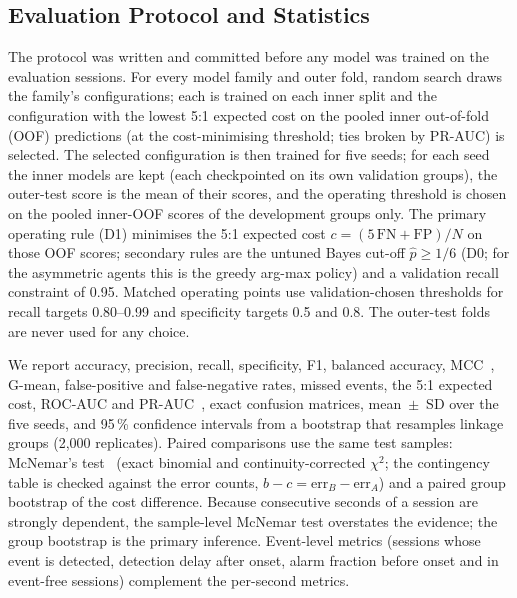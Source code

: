 \subsection{Evaluation Protocol and Statistics}
\label{sec:protocol}
The protocol was written and committed before any model was trained on the evaluation sessions. For every model family and outer fold, random search draws the family's configurations; each is trained on each inner split and the configuration with the lowest 5:1 expected cost on the pooled inner out-of-fold (OOF) predictions (at the cost-minimising threshold; ties broken by PR-AUC) is selected. The selected configuration is then trained for five seeds; for each seed the \nInner{} inner models are kept (each checkpointed on its own validation groups), the outer-test score is the mean of their scores, and the operating threshold is chosen on the pooled inner-OOF scores of the development groups only. The primary operating rule (D1) minimises the 5:1 expected cost $c=(5\,\mathrm{FN}+\mathrm{FP})/N$ on those OOF scores; secondary rules are the untuned Bayes cut-off $\hat p\ge1/6$ (D0; for the asymmetric agents this is the greedy arg-max policy) and a validation recall constraint of 0.95. Matched operating points use validation-chosen thresholds for recall targets 0.80--0.99 and specificity targets 0.5 and 0.8. The outer-test folds are never used for any choice.

We report accuracy, precision, recall, specificity, F1, balanced accuracy, MCC~\cite{chicco2020mcc}, G-mean, false-positive and false-negative rates, missed events, the 5:1 expected cost, ROC-AUC and PR-AUC~\cite{saito2015pr}, exact confusion matrices, mean~$\pm$~SD over the five seeds, and 95\,\% confidence intervals from a bootstrap that resamples linkage groups (2,000 replicates). Paired comparisons use the same test samples: McNemar's test~\cite{mcnemar1947,dietterich1998tests} (exact binomial and continuity-corrected $\chi^2$; the contingency table is checked against the error counts, $b-c=\mathrm{err}_B-\mathrm{err}_A$) and a paired group bootstrap of the cost difference. Because consecutive seconds of a session are strongly dependent, the sample-level McNemar test overstates the evidence; the group bootstrap is the primary inference. Event-level metrics (sessions whose event is detected, detection delay after onset, alarm fraction before onset and in event-free sessions) complement the per-second metrics.

